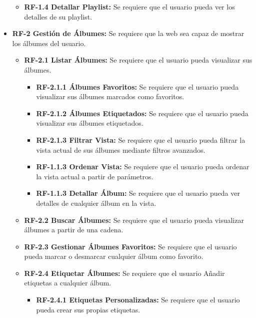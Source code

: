 \begin{itemize}
\begin{itemize}
            \item
                \textbf{RF-1.4 Detallar Playlist:} Se requiere que el usuario pueda ver los detalles de su playlist.
        \end{itemize}
    

        
    \item  
        \textbf{RF-2 Gestión de Álbumes:} Se requiere que la web sea capaz de mostrar los álbumes del usuario.
        \begin{itemize}
            \item 
                \textbf{RF-2.1 Listar Álbumes:} Se requiere que el usuario pueda visualizar sus álbumes.
                \begin{itemize}
                    \item 
                        \textbf{RF-2.1.1 Álbumes Favoritos:} Se requiere que el usuario pueda visualizar sus álbumes marcados como favoritos.
                    \item 
                        \textbf{RF-2.1.2 Álbumes Etiquetados:} Se requiere que el usuario pueda visualizar sus álbumes etiquetados.
                        
                    \item
                        \textbf{RF-2.1.3 Filtrar Vista:} Se requiere que el usuario pueda filtrar la vista actual de sus álbumes mediante filtros avanzados.
                    \item
                        \textbf{RF-1.1.3 Ordenar Vista:} Se requiere que el usuario pueda ordenar la vista actual a partir de parámetros.
                    \item
                        \textbf{RF-1.1.3 Detallar Álbum:} Se requiere que el usuario pueda ver detalles de cualquier álbum en la vista. 
                \end{itemize}
                
            \item 
                \textbf{RF-2.2 Buscar Álbumes:} Se requiere que el usuario pueda visualizar álbumes a partir de una cadena.
            \item
                \textbf{RF-2.3 Gestionar Álbumes Favoritos:} Se requiere que el usuario pueda marcar o desmarcar cualquier álbum como favorito.
            \item
                \textbf{RF-2.4 Etiquetar Álbumes:} Se requiere que el usuario Añadir etiquetas a cualquier álbum.
                \begin{itemize}
                    \item 
                    \textbf{RF-2.4.1 Etiquetas Personalizadas:} Se requiere que el usuario pueda crear sus propias etiquetas.
                \end{itemize}
        \end{itemize}


\end{itemize}
